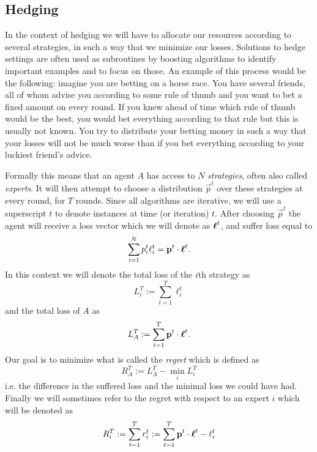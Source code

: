 \subsection{Hedging}
\label{subsec:hedging}
In the context of hedging we will have to allocate our resources according to several strategies, in such a way that we minimize our losses. Solutions to hedge settings are often used as subroutines by boosting algorithms to identify important examples and to focus on those. An example of this process would be the following: imagine you are betting on a horse race. You have several friends, all of whom advise you according to some rule of thumb and you want to bet a fixed amount on every round. If you knew ahead of time which rule of thumb would be the best, you would bet everything according to that rule but this is usually not known. You try to distribute your betting money in such a way that your losses will not be much worse than if you bet everything according to your luckiest friend's advice.  
\par Formally this means that an agent $A$ has access to $N$ \textit{strategies}, often also called \textit{experts}. It will then attempt to choose a distribution $\vec p^t$ over these strategies at every round, for $T$ rounds. Since all algorithms are iterative, we will use a superscript $t$ to denote instances at time (or iteration) $t$.
After choosing $\vec p^t$ the agent will receive a loss vector which we will denote as $\boldsymbol\ell^t$, and suffer loss equal to $$\sum_{i=1}^N p^t_i\ell_i^t = \mathbf{p}^t \cdot \boldsymbol\ell^t.$$ In this context we will denote the total loss of the $i$th strategy as $$L_i^T:= \sum_{t=1}^T \ell^t_i$$ and the total loss of $A$ as $$L_A^T := \sum_{t=1}^T \mathbf{p}^t \cdot \boldsymbol\ell^t.$$ Our goal is to minimize what is called the \textit{regret} which is defined as $$R_A^T:=L_A^T - \min_i L_i^T$$ i.e. the difference in the suffered loss and the minimal loss we could have had. Finally we will sometimes refer to the regret with respect to an expert $i$ which will be denoted as $$R^T_i := \sum^T_{t=1}r_i^t := \sum^T_{t=1} \mathbf{p}^t \cdot \boldsymbol\ell^t -\ell_i^t$$

